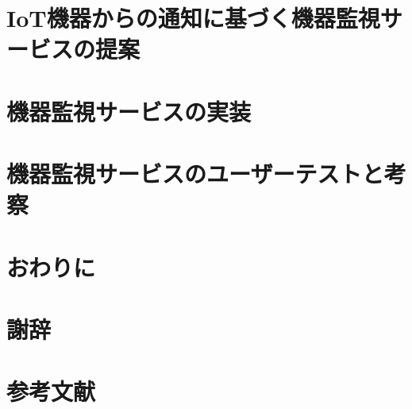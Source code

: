 \documentclass[a4paper]{jreport}
\begin{document}
\chapter{IoT機器からの通知に基づく機器監視サービスの提案}


\chapter{機器監視サービスの実装}


\chapter{機器監視サービスのユーザーテストと考察}


\chapter{おわりに}


\chapter{謝辞}

\chapter{参考文献}


\begin{comment}
流れ
序論
・IoTが流行している。
  ->何故？
	・コンピューターの高性能化と価格の低下 -> ほんとに？
	・家庭へのインターネットの普及 -> ほんとに？
  -> ほんとに？

・IoTのデバイス監視で困っている。
  -> デバイスの監視が本当に必要なのか？
	・サービスを止めないために必要 -> ほんとに？
  -> 何故デバイスの監視で困っているのか？
	・見に行くわけに行かない。
	  ->何故？
		・設置場所が離れていることがある。-> ほんとに？
		・数が多くて見きれない。 -> ほんとに？
	・サービスに組み込むのにも手間がかかる -> ほんとに？
  -> ほんとに？

提案
・IoT機器向けの機器監視サービスを作ったら、楽になるのでは？
  -> 他の解決策はどうなの？何がダメなの？
	・Ping
	・SNMP
	・Influxdb...
	・Elasticksearch...
  -> 他のがダメなのに、コレが何故OKなの？
	・IoTサービスの開発に特化しているため
	  ->どう特化してるの？
		・グラフ作成等の手間が不要
		・一覧して見ることができる
		・機器から通知が送られてくるので、NAPTで突っかからない。
  -> ほんとに？=>検証へ

検証
・田頭さんの研究で使ってもらい評価を得る。
　1. 使い方について簡単に説明
　2. 使っている様子を観測
  3. 最後に聞き取りを実施
-> なんだって？
　・こんな意見が聞けた。
　・サービスについては、〇〇だと言われた。
　・観察している中で、こんな所が気になった。

結論
・確かに楽になった or 楽にならなかった。
 -> 何故？

今後の課題としてこんなことがあった。
 ・
\end{comment}
\end{document}
